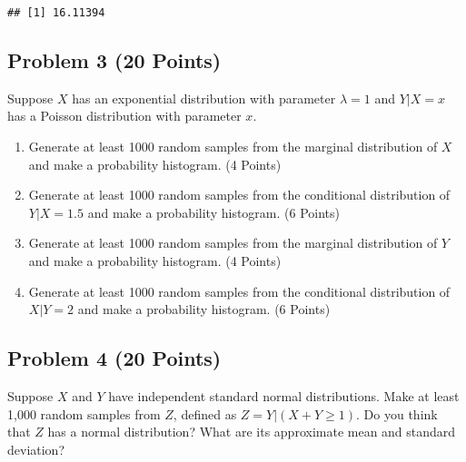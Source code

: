 \documentclass[
]{article}
\newenvironment{Shaded}{\begin{snugshade}}{\end{snugshade}}
\newcommand{\AttributeTok}[1]{\textcolor[rgb]{0.77,0.63,0.00}{#1}}
\newcommand{\DecValTok}[1]{\textcolor[rgb]{0.00,0.00,0.81}{#1}}
\newcommand{\FunctionTok}[1]{\textcolor[rgb]{0.00,0.00,0.00}{#1}}
\newcommand{\NormalTok}[1]{#1}
\newcommand{\OtherTok}[1]{\textcolor[rgb]{0.56,0.35,0.01}{#1}}
\newcommand{\SpecialCharTok}[1]{\textcolor[rgb]{0.00,0.00,0.00}{#1}}
\begin{document}
\begin{verbatim}
## [1] 16.11394
\end{verbatim}

\hypertarget{problem-3-20-points}{%
\subsection{Problem 3 (20 Points)}\label{problem-3-20-points}}

Suppose \(X\) has an exponential distribution with parameter
\(\lambda = 1\) and \(Y|X = x\) has a Poisson distribution with
parameter \(x\).

\begin{enumerate}
\def\labelenumi{\alph{enumi})}
\item
  Generate at least 1000 random samples from the marginal distribution
  of \(X\) and make a probability histogram. (4 Points)
\item
  Generate at least 1000 random samples from the conditional
  distribution of \(Y|X = 1.5\) and make a probability histogram. (6
  Points)
\item
  Generate at least 1000 random samples from the marginal distribution
  of \(Y\) and make a probability histogram. (4 Points)
\item
  Generate at least 1000 random samples from the conditional
  distribution of \(X|Y=2\) and make a probability histogram. (6 Points)
\end{enumerate}

\hypertarget{problem-4-20-points}{%
\subsection{Problem 4 (20 Points)}\label{problem-4-20-points}}

Suppose \(X\) and \(Y\) have independent standard normal distributions.
Make at least 1,000 random samples from \(Z\), defined as
\(Z = Y|(X + Y \ge 1)\). Do you think that \(Z\) has a normal
distribution? What are its approximate mean and standard deviation?

\begin{Shaded}
\end{Shaded}
\end{document}
